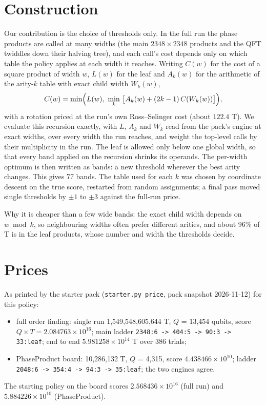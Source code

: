 \documentclass[11pt]{article}
\begin{document}
\section*{Construction}
Our contribution is the choice of thresholds only. In the full run the phase products are called at many widths (the main $2348 \times 2348$ products and the QFT twiddles down their halving tree), and each call's cost depends only on which table the policy applies at each width it reaches. Writing $C(w)$ for the cost of a square product of width $w$, $L(w)$ for the leaf and $A_k(w)$ for the arithmetic of the arity-$k$ table with exact child width $W_k(w)$,
\begin{align}
  C(w) = \min\Bigl( L(w),\ \min_{k}\ \bigl[ A_k(w) + (2k-1)\, C(W_k(w)) \bigr] \Bigr),
\end{align}
with a rotation priced at the run's own Ross--Selinger cost (about $122.4$ T). We evaluate this recursion exactly, with $L$, $A_k$ and $W_k$ read from the pack's engine at exact widths, over every width the run reaches, and weight the top-level calls by their multiplicity in the run. The leaf is allowed only below one global width, so that every band applied on the recursion shrinks its operands. The per-width optimum is then written as bands: a new threshold wherever the best arity changes. This gives 77 bands. The table used for each $k$ was chosen by coordinate descent on the true score, restarted from random assignments; a final pass moved single thresholds by $\pm 1$ to $\pm 3$ against the full-run price.

Why it is cheaper than a few wide bands: the exact child width depends on $w \bmod k$, so neighbouring widths often prefer different arities, and about 96\% of T is in the leaf products, whose number and width the thresholds decide.

\section*{Prices}
As printed by the starter pack (\texttt{starter.py price}, pack snapshot 2026-11-12) for this policy:
\begin{itemize}
  \item full order finding: single run 1,549,548,605,644 T, $Q$ = 13,454 qubits, score $Q \times T = 2.084763 \times 10^{16}$; main ladder \texttt{2348:6 -> 404:5 -> 90:3 -> 33:leaf}; end to end $5.981258 \times 10^{14}$ T over 386 trials;
  \item PhaseProduct board: 10,286,132 T, $Q$ = 4,315, score $4.438466 \times 10^{10}$; ladder \texttt{2048:6 -> 354:4 -> 94:3 -> 35:leaf}; the two engines agree.
\end{itemize}
The starting policy on the board scores $2.568436 \times 10^{16}$ (full run) and $5.884226 \times 10^{10}$ (PhaseProduct).
\end{document}
